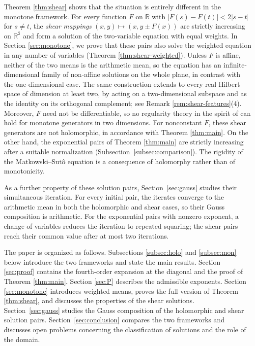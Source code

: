\documentclass[a4paper, reqno, 11pt]{amsart}
\theoremstyle{definition}
\begin{document}
Theorem \ref{thm:shear} shows that the situation is entirely different in the monotone framework.
For every function $F$ on $\mathbb{R}$ with $|F(s) - F(t)| < 2|s - t|$ for $s \neq t$, the {\it shear mappings} $(x,y) \mapsto (x, y \pm F(x))$ are strictly increasing on $\mathbb{R}^2$ and form a solution of the two-variable equation with equal weights.
In Section \ref{sec:monotone}, we prove that these pairs also solve the weighted equation in any number of variables (Theorem \ref{thm:shear-weighted}).
Unless $F$ is affine, neither of the two means is the arithmetic mean, so the equation has an infinite-dimensional family of non-affine solutions on the whole plane, in contrast with the one-dimensional case.
The same construction extends to every real Hilbert space of dimension at least two, by acting on a two-dimensional subspace and as the identity on its orthogonal complement; see Remark \ref{rem:shear-features}(4).
Moreover, $F$ need not be differentiable, so no regularity theory in the spirit of \cite{DP} can hold for monotone generators in two dimensions.
For nonconstant $F$, these shear generators are not holomorphic, in accordance with Theorem \ref{thm:main}. 
On the other hand, the exponential pairs of Theorem \ref{thm:main} are strictly increasing after a suitable normalization (Subsection~\ref{subsec:comparison}).
The rigidity of the Matkowski--Sut\^o equation is a consequence of holomorphy rather than of monotonicity.

As a further property of these solution pairs, Section~\ref{sec:gauss} studies their simultaneous iteration.
For every initial pair, the iterates converge to the arithmetic mean in both the holomorphic and shear cases, so their Gauss composition is arithmetic.
For the exponential pairs with nonzero exponent, a change of variables reduces the iteration to repeated squaring; the shear pairs reach their common value after at most two iterations.

The paper is organized as follows.
Subsections \ref{subsec:holo} and \ref{subsec:mon} below introduce the two frameworks and state the main results. 
Section \ref{sec:proof} contains the fourth-order expansion at the diagonal and the proof of Theorem \ref{thm:main}. 
Section \ref{sec:P} describes the admissible exponents.
Section \ref{sec:monotone} introduces weighted means, proves the full version of Theorem \ref{thm:shear}, and discusses the properties of the shear solutions.
Section~\ref{sec:gauss} studies the Gauss composition of the holomorphic and shear solution pairs.
Section~\ref{sec:conclusion} compares the two frameworks and discusses open problems concerning the classification of solutions and the role of the domain.
\end{document}
